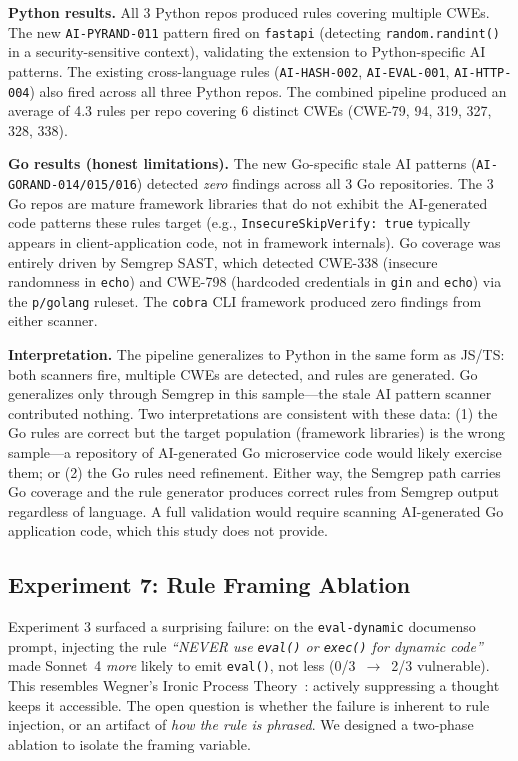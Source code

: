 \documentclass[conference,10pt]{IEEEtran}
\begin{document}
\textbf{Python results.} All 3 Python repos produced rules covering multiple CWEs. The new \texttt{AI-PYRAND-011} pattern fired on \texttt{fastapi} (detecting \texttt{random.randint()} in a security-sensitive context), validating the extension to Python-specific AI patterns. The existing cross-language rules (\texttt{AI-HASH-002}, \texttt{AI-EVAL-001}, \texttt{AI-HTTP-004}) also fired across all three Python repos. The combined pipeline produced an average of 4.3 rules per repo covering 6 distinct CWEs (CWE-79, 94, 319, 327, 328, 338).

\textbf{Go results (honest limitations).} The new Go-specific stale AI patterns (\texttt{AI-GORAND-014/015/016}) detected \textit{zero} findings across all 3 Go repositories. The 3 Go repos are mature framework libraries that do not exhibit the AI-generated code patterns these rules target (e.g., \texttt{InsecureSkipVerify:~true} typically appears in client-application code, not in framework internals). Go coverage was entirely driven by Semgrep SAST, which detected CWE-338 (insecure randomness in \texttt{echo}) and CWE-798 (hardcoded credentials in \texttt{gin} and \texttt{echo}) via the \texttt{p/golang} ruleset. The \texttt{cobra} CLI framework produced zero findings from either scanner.

\textbf{Interpretation.} The pipeline generalizes to Python in the same form as JS/TS: both scanners fire, multiple CWEs are detected, and rules are generated. Go generalizes only through Semgrep in this sample---the stale AI pattern scanner contributed nothing. Two interpretations are consistent with these data: (1) the Go rules are correct but the target population (framework libraries) is the wrong sample---a repository of AI-generated Go microservice code would likely exercise them; or (2) the Go rules need refinement. Either way, the Semgrep path carries Go coverage and the rule generator produces correct rules from Semgrep output regardless of language. A full validation would require scanning AI-generated Go application code, which this study does not provide.

\subsection{Experiment 7: Rule Framing Ablation}
\label{sec:framing-ablation}

Experiment 3 surfaced a surprising failure: on the \texttt{eval-dynamic} documenso prompt, injecting the rule \textit{``NEVER use \texttt{eval()} or \texttt{exec()} for dynamic code''} made Sonnet~4 \textit{more} likely to emit \texttt{eval()}, not less (0/3~$\rightarrow$~2/3 vulnerable). This resembles Wegner's Ironic Process Theory~\cite{wegner-ironic}: actively suppressing a thought keeps it accessible. The open question is whether the failure is inherent to rule injection, or an artifact of \textit{how the rule is phrased}. We designed a two-phase ablation to isolate the framing variable.
\end{document}
